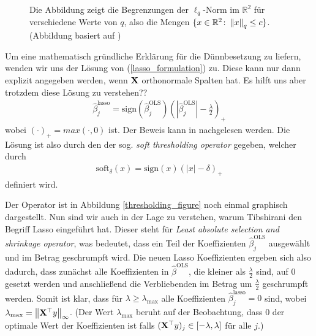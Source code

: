 \begin{figure}
\caption{Die Abbildung zeigt die Begrenzungen der $\ell_q$-Norm im $\mathbb{R}^2$ für verschiedene Werte von $q$, also die Mengen $\{x \in \mathbb{R}^2 \colon \left\lVert x \right\rVert_{q} \leq c \}$. (Abbildung basiert auf \cite{hastie_elements})}
\label{norm_figure}
\end{figure}

Um eine mathematisch gründliche Erklärung für die Dünnbesetzung zu liefern, wenden wir uns der Lösung von (\ref{lasso_formulation}) zu. Diese kann nur dann explizit angegeben werden, wenn $\mathbf{X}$ orthonormale Spalten hat. Es hilft uns aber trotzdem diese Lösung zu verstehen??
\begin{align}
\hat{\beta}_j^{\text{lasso}} = \text{sign}(\hat{\beta}_j^{\text{OLS}}) \left(\left|\hat{\beta}_j^{\text{OLS}}\right| - \frac{\lambda}{2}\right)_{+}
\end{align}
wobei $(\cdot)_+ = max(\cdot, 0)$ ist. Der Beweis kann in \cite{murphy} nachgelesen werden. Die Lösung ist also durch den der sog. \textit{soft thresholding operator} gegeben, welcher durch
\begin{align}
\text{soft}_{\delta}(x) = \text{sign}(x)(|x| - \delta)_+
\end{align}
definiert wird.

Der Operator ist in Abbildung \ref{thresholding_figure} noch einmal graphisch dargestellt. Nun sind wir auch in der Lage zu verstehen, warum Tibshirani \cite{tibshirani_lasso} den Begriff Lasso eingeführt hat. Dieser steht für \textit{Least absolute selection and shrinkage operator}, was bedeutet, dass ein Teil der Koeffizienten $\hat{\beta}_j^{\text{OLS}}$ ausgewählt und im Betrag geschrumpft wird. Die neuen Lasso Koeffizienten ergeben sich also dadurch, dass zunächst alle Koeffizienten in $\hat{\beta}^{\text{OLS}}$, die kleiner als $\frac{\lambda}{2}$ sind, auf $0$ gesetzt werden und anschließend die Verbliebenden im Betrag um $\frac{\lambda}{2}$ geschrumpft werden. Somit ist klar, dass für $\lambda \geq \lambda_{\text{max}}$ alle Koeffizienten $\hat{\beta}_j^{\text{lasso}} = 0$ sind, wobei $\lambda_{\text{max}} = \left\lVert \mathbf{X}^{\top}y \right\rVert_{\infty}$. (Der Wert $\lambda_{\text{max}}$ beruht auf der Beobachtung, dass $0$ der optimale Wert der Koeffizienten ist falls $(\mathbf{X}^{\top}y)_j \in [-\lambda, \lambda]$ für alle $j$.) 

